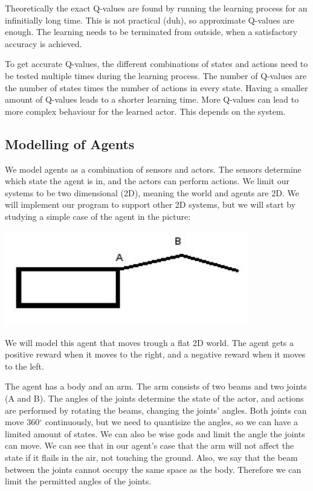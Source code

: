 \documentclass{article}
\begin{document}
Theoretically the exact Q-values are found by running the learning process
for an infinitially long time. This is not practical (duh), so approximate
Q-values are enough. The learning needs to be terminated from outside, when a
satisfactory accuracy is achieved.

To get accurate Q-values, the different combinations of states and actions
need to be tested multiple times during the learning process.
The number of Q-values are the number of states times the number of actions
in every state. Having a smaller amount of Q-values leads to a shorter learning
time. More Q-values can lead to more complex behaviour for the learned actor.
This depends on the system.


\subsection{Modelling of Agents}
We model agents as a combination of sensors and actors. The sensors determine
which state the agent is in, and the actors can perform actions.
We limit our systems to be two dimensional (2D), meaning the world and agents
are 2D. We will implement our program to support other 2D systems, but we
will start by studying a simple case of the agent in the picture:

\includegraphics[width=0.8\textwidth]{simple_agent}

We will model this agent that moves trough a flat 2D world.
The agent gets a positive reward when it moves to the right, and a negative
reward when it moves to the left.

The agent has a body and an arm. The arm consists of two beams and two joints
(A and B). The angles of the joints determine the state of the actor, and
actions are performed by rotating the beams, changing the joints' angles.
Both joints can move 360$^\circ$ continuously, but we need to quantisize
the angles, so we can have a limited amount of states. We can also be wise
gods and limit the angle the joints can move. We can see that in our agent's
case that the arm will not affect the state if it flails in the air, not
touching the ground. Also, we say that the beam between the joints cannot
occupy the same space as the body. Therefore we can limit the permitted angles
of the joints.
\end{document}
